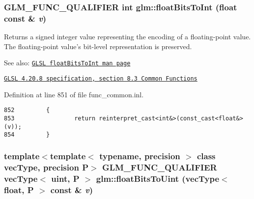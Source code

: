 \hypertarget{group__core__func__common_gdc6a536a7bef046c3293d2ccad6d9ca2}{
\subsubsection[floatBitsToInt]{\setlength{\rightskip}{0pt plus 5cm}GLM\_\-FUNC\_\-QUALIFIER int glm::floatBitsToInt (float const \& {\em v})}}
\label{group__core__func__common_gdc6a536a7bef046c3293d2ccad6d9ca2}


Returns a signed integer value representing the encoding of a floating-point value. The floating-point value's bit-level representation is preserved.

\begin{Desc}
\item[See also:]\href{http://www.opengl.org/sdk/docs/manglsl/xhtml/floatBitsToInt.xml}{\tt GLSL floatBitsToInt man page} 

\href{http://www.opengl.org/registry/doc/GLSLangSpec.4.20.8.pdf}{\tt GLSL 4.20.8 specification, section 8.3 Common Functions} \end{Desc}


Definition at line 851 of file func\_\-common.inl.

\begin{Code}\begin{verbatim}852         {
853                 return reinterpret_cast<int&>(const_cast<float&>(v));
854         }
\end{verbatim}
\end{Code}


\hypertarget{group__core__func__common_gd25f4b1449b40ee395b05552e98d103b}{
\subsubsection[floatBitsToUint]{\setlength{\rightskip}{0pt plus 5cm}template$<$template$<$ typename, precision $>$ class vecType, precision P$>$ GLM\_\-FUNC\_\-QUALIFIER vecType$<$ uint, P $>$ glm::floatBitsToUint (vecType$<$ float, P $>$ const \& {\em v})}}
\label{group__core__func__common_gd25f4b1449b40ee395b05552e98d103b}


